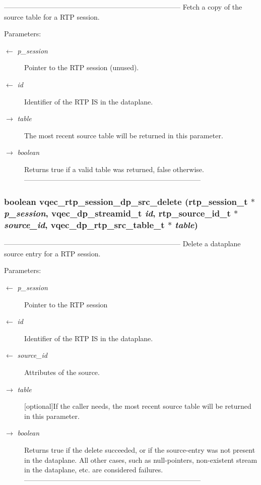 --------------------------------------------------------------------------- Fetch a copy of the source table for a RTP session.

\begin{Desc}
\item[Parameters:]
\begin{description}
\item[\mbox{$\leftarrow$} {\em p\_\-session}]Pointer to the RTP session (unused). \item[\mbox{$\leftarrow$} {\em id}]Identifier of the RTP IS in the dataplane. \item[\mbox{$\rightarrow$} {\em table}]The most recent source table will be returned in this parameter. \item[\mbox{$\rightarrow$} {\em boolean}]Returns true if a valid table was returned, false otherwise. --------------------------------------------------------------------------- \end{description}
\end{Desc}
\subsubsection{\setlength{\rightskip}{0pt plus 5cm}boolean vqec\_\-rtp\_\-session\_\-dp\_\-src\_\-delete (rtp\_\-session\_\-t $\ast$ {\em p\_\-session}, vqec\_\-dp\_\-streamid\_\-t {\em id}, rtp\_\-source\_\-id\_\-t $\ast$ {\em source\_\-id}, vqec\_\-dp\_\-rtp\_\-src\_\-table\_\-t $\ast$ {\em table})}\label{vqec__rtp_8h_d9af1c970be1aa9934b5b854dc2e7b14}


--------------------------------------------------------------------------- Delete a dataplane source entry for a RTP session.

\begin{Desc}
\item[Parameters:]
\begin{description}
\item[\mbox{$\leftarrow$} {\em p\_\-session}]Pointer to the RTP session \item[\mbox{$\leftarrow$} {\em id}]Identifier of the RTP IS in the dataplane. \item[\mbox{$\leftarrow$} {\em source\_\-id}]Attributes of the source. \item[\mbox{$\rightarrow$} {\em table}][optional]If the caller needs, the most recent source table will be returned in this parameter. \item[\mbox{$\rightarrow$} {\em boolean}]Returns true if the delete succeeded, or if the source-entry was not present in the dataplane. All other cases, such as null-pointers, non-existent stream in the dataplane, etc. are considered failures. --------------------------------------------------------------------------- \end{description}
\end{Desc}
